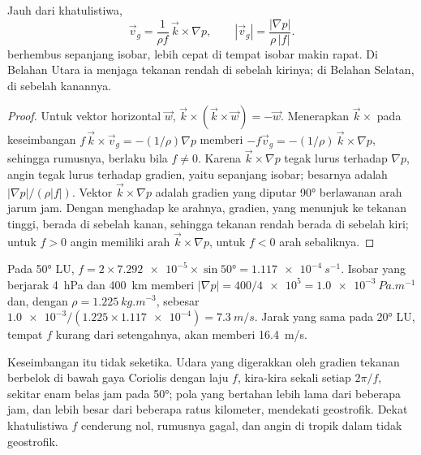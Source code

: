 \begin{theorem}\label{thm:b1:atmospheric-circulation:geostrophic}
Jauh dari khatulistiwa,
\[
  \vec v_g = \frac{1}{\rho f}\,\vec k\times\nabla p, \qquad
  |\vec v_g| = \frac{|\nabla p|}{\rho\,|f|} .
\]
 berhembus sepanjang isobar, lebih cepat di tempat isobar makin rapat. Di Belahan Utara ia menjaga tekanan rendah di sebelah kirinya; di Belahan Selatan, di sebelah kanannya.
\end{theorem}

\begin{proof}
Untuk vektor horizontal $\vec w$, $\vec k\times(\vec k\times\vec w) = -\vec w$.
Menerapkan $\vec k\times$ pada keseimbangan $f\,\vec k\times\vec v_g = -(1/\rho)\nabla p$
memberi $-f\vec v_g = -(1/\rho)\,\vec k\times\nabla p$, sehingga rumusnya, berlaku bila
$f \neq 0$. Karena $\vec k\times\nabla p$ tegak lurus terhadap $\nabla p$, angin tegak lurus
terhadap gradien, yaitu sepanjang isobar; besarnya adalah $|\nabla
p|/(\rho|f|)$. Vektor $\vec k\times\nabla p$ adalah gradien yang diputar \ang{90}
berlawanan arah jarum jam. Dengan menghadap ke arahnya, gradien, yang menunjuk ke tekanan tinggi,
berada di sebelah kanan, sehingga tekanan rendah berada di sebelah kiri; untuk $f > 0$ angin memiliki
arah $\vec k\times\nabla p$, untuk $f < 0$ arah sebaliknya.
\end{proof}

\begin{example}\label{ex:b1:atmospheric-circulation:geostrophic}
Pada \ang{50} LU, $f = 2 \times \num{7.292e-5} \times \sin\ang{50} = \qty{1.117e-4}{s^{-1}}$.
Isobar yang berjarak \qty{4}{hPa} dan \qty{400}{km} memberi $|\nabla p| = 400/\num{4e5} =
\qty{1.0e-3}{Pa.m^{-1}}$ dan, dengan $\rho = \qty{1.225}{kg.m^{-3}}$, 
sebesar $\num{1.0e-3}/(1.225 \times \num{1.117e-4}) = \qty{7.3}{m/s}$. Jarak yang sama
pada \ang{20} LU, tempat $f$ kurang dari setengahnya, akan memberi
\qty{16.4}{m/s}.
\end{example}

Keseimbangan itu tidak seketika. Udara yang digerakkan oleh gradien tekanan berbelok di bawah gaya Coriolis dengan laju $f$, kira-kira sekali setiap $2\pi/f$, sekitar enam belas jam pada \ang{50}; pola yang bertahan lebih lama dari beberapa jam, dan lebih besar dari beberapa ratus kilometer, mendekati geostrofik. Dekat khatulistiwa $f$ cenderung nol, rumusnya gagal, dan angin di tropik dalam tidak geostrofik.

